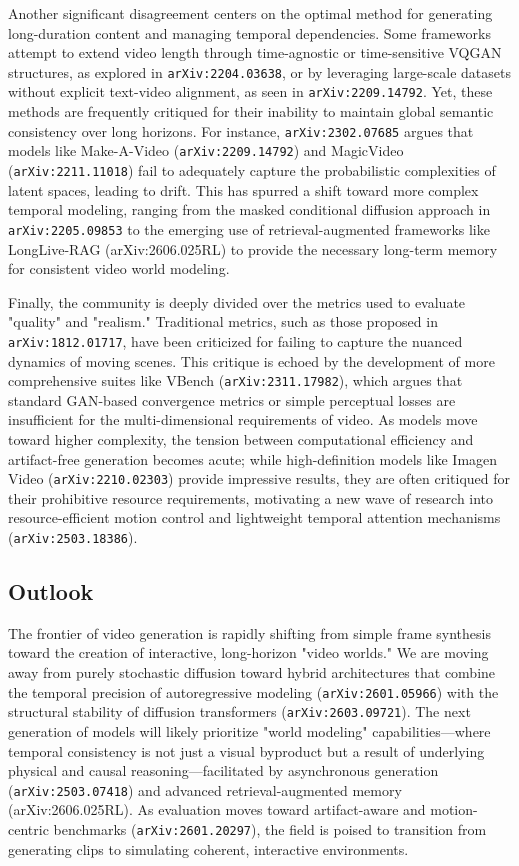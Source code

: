 \documentclass[11pt]{article}
\begin{document}
Another significant disagreement centers on the optimal method for generating long-duration content and managing temporal dependencies. Some frameworks attempt to extend video length through time-agnostic or time-sensitive VQGAN structures, as explored in \texttt{arXiv:2204.03638}, or by leveraging large-scale datasets without explicit text-video alignment, as seen in \texttt{arXiv:2209.14792}. Yet, these methods are frequently critiqued for their inability to maintain global semantic consistency over long horizons. For instance, \texttt{arXiv:2302.07685} argues that models like Make-A-Video (\texttt{arXiv:2209.14792}) and MagicVideo (\texttt{arXiv:2211.11018}) fail to adequately capture the probabilistic complexities of latent spaces, leading to drift. This has spurred a shift toward more complex temporal modeling, ranging from the masked conditional diffusion approach in \texttt{arXiv:2205.09853} to the emerging use of retrieval-augmented frameworks like LongLive-RAG (arXiv:2606.025RL) to provide the necessary long-term memory for consistent video world modeling.

Finally, the community is deeply divided over the metrics used to evaluate "quality" and "realism." Traditional metrics, such as those proposed in \texttt{arXiv:1812.01717}, have been criticized for failing to capture the nuanced dynamics of moving scenes. This critique is echoed by the development of more comprehensive suites like VBench (\texttt{arXiv:2311.17982}), which argues that standard GAN-based convergence metrics or simple perceptual losses are insufficient for the multi-dimensional requirements of video. As models move toward higher complexity, the tension between computational efficiency and artifact-free generation becomes acute; while high-definition models like Imagen Video (\texttt{arXiv:2210.02303}) provide impressive results, they are often critiqued for their prohibitive resource requirements, motivating a new wave of research into resource-efficient motion control and lightweight temporal attention mechanisms (\texttt{arXiv:2503.18386}).

\subsection{Outlook}

The frontier of video generation is rapidly shifting from simple frame synthesis toward the creation of interactive, long-horizon "video worlds." We are moving away from purely stochastic diffusion toward hybrid architectures that combine the temporal precision of autoregressive modeling (\texttt{arXiv:2601.05966}) with the structural stability of diffusion transformers (\texttt{arXiv:2603.09721}). The next generation of models will likely prioritize "world modeling" capabilities—where temporal consistency is not just a visual byproduct but a result of underlying physical and causal reasoning—facilitated by asynchronous generation (\texttt{arXiv:2503.07418}) and advanced retrieval-augmented memory (arXiv:2606.025RL). As evaluation moves toward artifact-aware and motion-centric benchmarks (\texttt{arXiv:2601.20297}), the field is poised to transition from generating clips to simulating coherent, interactive environments.
\end{document}
